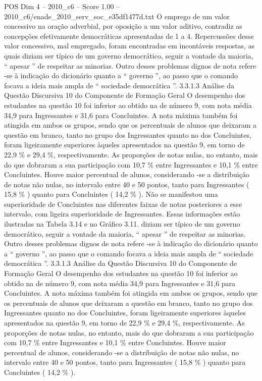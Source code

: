 \begin{textsample}{POS Dim 4 – 2010\_c6 – Score 1.00 – 2010\_c6/enade\_2010\_serv\_soc\_e35df1477d.txt}
O emprego de um valor concessivo na oração adverbial, por oposição a um valor aditivo, contradiz as concepções efetivamente democráticas apresentadas de 1 a 4.
Repercussões desse valor concessivo, mal empregado, foram encontradas em incontáveis respostas, as quais diziam ser típico de um governo democrático, seguir a vontade da maioria, “ apesar ” de respeitar as minorias.
Outro desses problemas dignos de nota refere -se à indicação do dicionário quanto a “ governo ”, ao passo que o comando focava a ideia mais ampla de “ sociedade democrática ”. 3.3.1.3 Análise da Questão Discursiva 10 do Componente de Formação Geral O desempenho dos estudantes na questão 10 foi inferior ao obtido na de número 9, com nota média 34,9 para Ingressantes e 31,6 para Concluintes.
A nota máxima também foi atingida em ambos os grupos, sendo que os percentuais de alunos que deixaram a questão em branco, tanto no grupo dos Ingressantes quanto no dos Concluintes, foram ligeiramente superiores àqueles apresentados na questão 9, em torno de 22,9 \% e 29,4 \%, respectivamente.
As proporções de notas nulas, no entanto, mais do que dobraram a sua participação com 10,7 \% entre Ingressantes e 10,1 \% entre Concluintes.
Houve maior percentual de alunos, considerando -se a distribuição de notas não nulas, no intervalo entre 40 e 50 pontos, tanto para Ingressantes ( 15,8 \% ) quanto para Concluintes ( 14,2 \% ).
Não se manifestou uma superioridade de Concluintes nas diferentes faixas de notas posteriores a esse intervalo, com ligeira superioridade de Ingressantes.
Essas informações estão ilustradas na Tabela 3.14 e no Gráfico 3.11. diziam ser típico de um governo democrático, seguir a vontade da maioria, “ apesar ” de respeitar as minorias.
Outro desses problemas dignos de nota refere -se à indicação do dicionário quanto a “ governo ”, ao passo que o comando focava a ideia mais ampla de “ sociedade democrática ”. 3.3.1.3 Análise da Questão Discursiva 10 do Componente de Formação Geral O desempenho dos estudantes na questão 10 foi inferior ao obtido na de número 9, com nota média 34,9 para Ingressantes e 31,6 para Concluintes.
A nota máxima também foi atingida em ambos os grupos, sendo que os percentuais de alunos que deixaram a questão em branco, tanto no grupo dos Ingressantes quanto no dos Concluintes, foram ligeiramente superiores àqueles apresentados na questão 9, em torno de 22,9 \% e 29,4 \%, respectivamente.
As proporções de notas nulas, no entanto, mais do que dobraram a sua participação com 10,7 \% entre Ingressantes e 10,1 \% entre Concluintes.
Houve maior percentual de alunos, considerando -se a distribuição de notas não nulas, no intervalo entre 40 e 50 pontos, tanto para Ingressantes ( 15,8 \% ) quanto para Concluintes ( 14,2 \% ).

\end{textsample}
